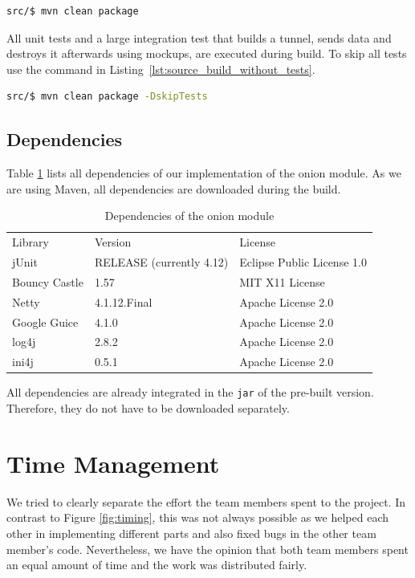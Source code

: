 \documentclass[paper=letter, fontsize=12pt]{article}
\begin{document}
\begin{lstlisting}[language=bash, caption=Build the project from source, label=lst:source_build]
src/$ mvn clean package
\end{lstlisting}

All unit tests and a large integration test that builds a tunnel, sends data and destroys it afterwards using mockups, are executed during build.
To skip all tests use the command in Listing~\ref{lst:source_build_without_tests}.

\begin{lstlisting}[language=bash, caption=Build the project from source without tests, label=lst:source_build_without_tests]
src/$ mvn clean package -DskipTests
\end{lstlisting}


\subsection{Dependencies}
Table \ref{tab:dependencies} lists all dependencies of our implementation of the onion module.
As we are using Maven, all dependencies are downloaded during the build.

\begin{table}[H]
    \centering
    \caption{Dependencies of the onion module}
    \label{tab:dependencies}
    \begin{tabular}{l|l|l}
        Library         & Version                   & License \\ \Xhline{3\arrayrulewidth}
        jUnit           & RELEASE (currently 4.12)  & Eclipse Public License 1.0 \\
        Bouncy Castle   & 1.57                      & MIT X11 License \\
        Netty           & 4.1.12.Final              & Apache License 2.0 \\
        Google Guice    & 4.1.0                     & Apache License 2.0 \\
        log4j           & 2.8.2                     & Apache License 2.0 \\
        ini4j           & 0.5.1                     & Apache License 2.0
    \end{tabular}
\end{table}

All dependencies are already integrated in the \texttt{jar} of the pre-built version.
Therefore, they do not have to be downloaded separately.

\section{Time Management}
We tried to clearly separate the effort the team members spent to the project.
In contrast to Figure \ref{fig:timing}, this was not always possible as we helped each other in implementing different parts and also fixed bugs in the other team member's code.
Nevertheless, we have the opinion that both team members spent an equal amount of time and the work was distributed fairly.
\end{document}
